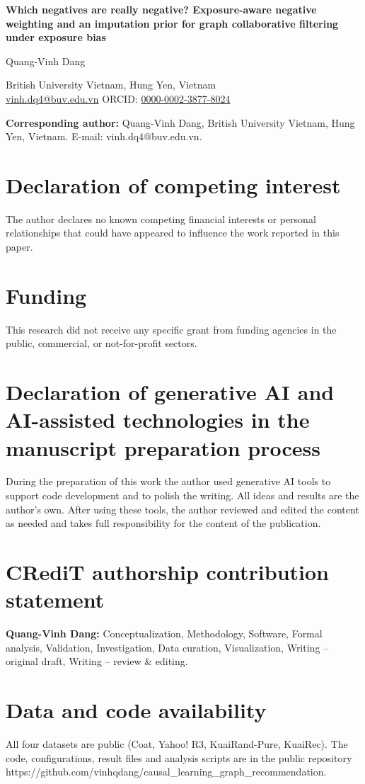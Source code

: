 \documentclass[12pt]{article}
\begin{document}
\begin{center}
{\Large\bfseries Which negatives are really negative? Exposure-aware negative weighting and an imputation prior for graph collaborative filtering under exposure bias\par}
\vspace{1.5em}
{\large Quang-Vinh Dang\par}
\vspace{0.5em}
British University Vietnam, Hung Yen, Vietnam\\
\href{mailto:vinh.dq4@buv.edu.vn}{vinh.dq4@buv.edu.vn} \quad
ORCID: \href{https://orcid.org/0000-0002-3877-8024}{0000-0002-3877-8024}
\end{center}
\vspace{1em}
\noindent\textbf{Corresponding author:} Quang-Vinh Dang, British University Vietnam, Hung Yen, Vietnam. E-mail: vinh.dq4@buv.edu.vn.

\section*{Declaration of competing interest}
The author declares no known competing financial interests or personal relationships that could have appeared to influence the work reported in this paper.

\section*{Funding}
This research did not receive any specific grant from funding agencies in the public, commercial, or not-for-profit sectors.

\section*{Declaration of generative AI and AI-assisted technologies in the manuscript preparation process}
During the preparation of this work the author used generative AI tools to support code development and to polish the writing. All ideas and results are the author's own. After using these tools, the author reviewed and edited the content as needed and takes full responsibility for the content of the publication.

\section*{CRediT authorship contribution statement}
\textbf{Quang-Vinh Dang:} Conceptualization, Methodology, Software, Formal analysis, Validation, Investigation, Data curation, Visualization, Writing -- original draft, Writing -- review \& editing.

\section*{Data and code availability}
All four datasets are public (Coat, Yahoo! R3, KuaiRand-Pure, KuaiRec). The code, configurations, result files and analysis scripts are in the public repository https://github.com/vinhqdang/causal_learning_graph_recommendation.
\end{document}
